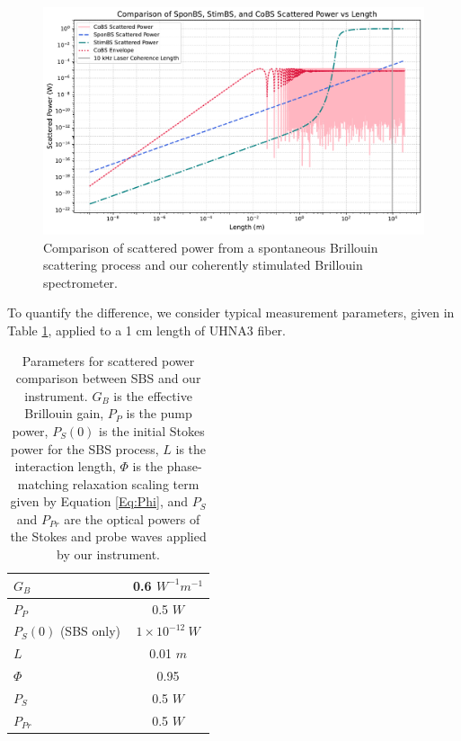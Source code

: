 \documentclass[%
  reprint,
  superscriptaddress,
  amsmath,amssymb,
  aps,
  prapplied,
]{revtex4-2}
\begin{document}
\begin{figure}[t]
\centering
\includegraphics[width=.95\textwidth]{SponBSvsStimBSvsCoBS.pdf}
\caption{Comparison of scattered power from a spontaneous Brillouin scattering process and our coherently stimulated Brillouin spectrometer.}
\label{fig:SponBSvsStimBSvsCoBS}
\end{figure}

To quantify the difference, we consider typical measurement parameters, given in Table \ref{tab:SBS Comparison Parameters}, applied to a 1 cm length of UHNA3 fiber.

\begin{table}[h]
  \centering
  \renewcommand{\arraystretch}{1.2}
  \begin{tabular}{|l|c|}
    \hline
    $G_{B}$ & 0.6 $W^{-1} m^{-1}$ \\
    \hline
    $P_{P}$ & 0.5 $W$ \\
    \hline
    $P_{S}(0)$ (SBS only) & $1 \times 10^{-12} \ W$ \\
    \hline
    $L$ & 0.01 $m$ \\
    \hline
    $\Phi$ & 0.95 \\
    \hline
    $P_{S}$ & 0.5 $W$ \\
    \hline
    $P_{Pr}$ & 0.5 $W$ \\
    \hline
  \end{tabular}
  \caption{Parameters for scattered power comparison between SBS and our instrument. $G_{B}$ is the effective Brillouin gain, $P_{P}$ is the pump power, $P_{S}(0)$ is the initial Stokes power for the SBS process, $L$ is the interaction length, $\Phi$ is the phase-matching relaxation scaling term given by Equation \ref{Eq:Phi}, and $P_{S}$ and $P_{Pr}$ are the optical powers of the Stokes and probe waves applied by our instrument.}
  \label{tab:SBS Comparison Parameters}
\end{table}
\end{document}
